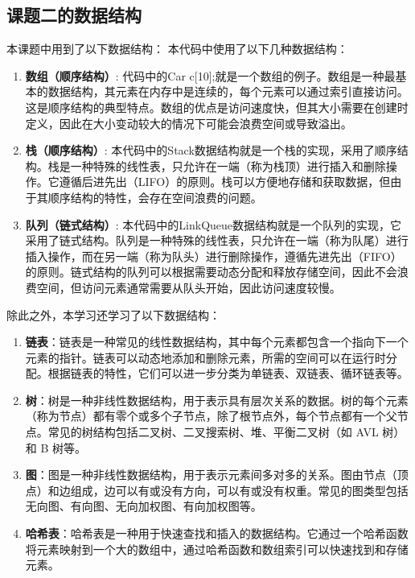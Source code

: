 \documentclass[UTF8,titlepage]{ctexart}
\numberwithin{figure}{section}
\begin{document}
\subsection{课题二的数据结构}
本课题中用到了以下数据结构：
本代码中使用了以下几种数据结构：
\begin{enumerate}
    \item \textbf{数组（顺序结构）}: 代码中的Car c[10];就是一个数组的例子。数组是一种最基本的数据结构，其元素在内存中是连续的，每个元素可以通过索引直接访问。这是顺序结构的典型特点。数组的优点是访问速度快，但其大小需要在创建时定义，因此在大小变动较大的情况下可能会浪费空间或导致溢出。
    \item \textbf{栈（顺序结构）}: 本代码中的Stack数据结构就是一个栈的实现，采用了顺序结构。栈是一种特殊的线性表，只允许在一端（称为栈顶）进行插入和删除操作。它遵循后进先出（LIFO）的原则。栈可以方便地存储和获取数据，但由于其顺序结构的特性，会存在空间浪费的问题。
    \item \textbf{队列（链式结构）}: 本代码中的LinkQueue数据结构就是一个队列的实现，它采用了链式结构。队列是一种特殊的线性表，只允许在一端（称为队尾）进行插入操作，而在另一端（称为队头）进行删除操作，遵循先进先出（FIFO）的原则。链式结构的队列可以根据需要动态分配和释放存储空间，因此不会浪费空间，但访问元素通常需要从队头开始，因此访问速度较慢。
\end{enumerate}

除此之外，本学习还学习了以下数据结构：
\begin{enumerate}
    \item \textbf{链表}：链表是一种常见的线性数据结构，其中每个元素都包含一个指向下一个元素的指针。链表可以动态地添加和删除元素，所需的空间可以在运行时分配。根据链表的特性，它们可以进一步分类为单链表、双链表、循环链表等。

    \item \textbf{树}：树是一种非线性数据结构，用于表示具有层次关系的数据。树的每个元素（称为节点）都有零个或多个子节点，除了根节点外，每个节点都有一个父节点。常见的树结构包括二叉树、二叉搜索树、堆、平衡二叉树（如 AVL 树）和 B 树等。
    
    \item \textbf{图}：图是一种非线性数据结构，用于表示元素间多对多的关系。图由节点（顶点）和边组成，边可以有或没有方向，可以有或没有权重。常见的图类型包括无向图、有向图、无向加权图、有向加权图等。
    
    \item \textbf{哈希表}：哈希表是一种用于快速查找和插入的数据结构。它通过一个哈希函数将元素映射到一个大的数组中，通过哈希函数和数组索引可以快速找到和存储元素。
\end{enumerate}
\end{document}
